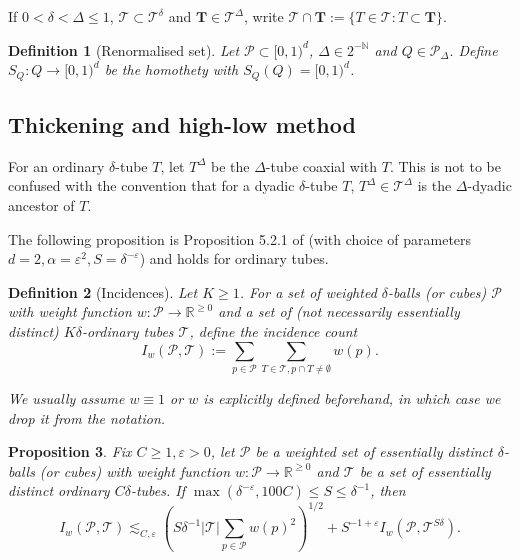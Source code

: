 \documentclass{amsart}
\newtheorem{prop}{Proposition}[section]
\newtheorem{definition}[prop]{Definition}
\newcommand{\R}{\mathbb{R}}
\newcommand{\T}{\mathcal{T}}
\newcommand{\eps}{\varepsilon}
\newcommand{\lesim}{\lesssim}
\newcommand{\bT}{\mathbf{T}}
\newcommand{\cT}{\mathcal{T}}
\newcommand{\cP}{\mathcal{P}}
\begin{document}
If $0<\delta <\Delta \leq 1$,  $\cT\subset \cT^{\delta}$ and $\bT\in \cT^{\Delta}$, write $\cT\cap \bT:=\{ T\in \cT: T\subset \bT\}$. 


\begin{definition}[Renormalised set]
    Let $\cP\subset [0,1)^d$, $\Delta\in 2^{-\mathbb{N}}$ and $Q\in \cP_{\Delta}.$ Define $S_Q: Q\rightarrow [0,1)^d$ be the homothety  with $S_Q(Q)=[0,1)^d$. 
\end{definition}
 

\subsection{Thickening and high-low method}
For an ordinary $\delta$-tube $T$, let $T^\Delta$ be the $\Delta$-tube coaxial with $T$. This is not to be confused with the convention that for a dyadic $\delta$-tube $T$, $T^\Delta \in \cT^\Delta$ is the $\Delta$-dyadic ancestor of $T$. %

The following proposition is Proposition 5.2.1 of \cite{bradshaw2022additive} (with choice of parameters $d = 2, \alpha = \eps^2, S = \delta^{-\eps}$) and holds for ordinary tubes.

\begin{definition}[Incidences]
    Let $K \ge 1$. For a set of weighted $\delta$-balls (or cubes) $\cP$ with weight function $w : \cP \to \R^{\ge 0}$ and a set of (not necessarily essentially distinct) $K\delta$-ordinary tubes $\T$, define the incidence count \[I_w (\cP, \T) := \sum_{p \in \cP} \sum_{T \in \T, p \cap T \neq \emptyset} w(p).\]

    We usually assume $w \equiv 1$ or $w$ is explicitly defined beforehand, in which case we drop it from the notation.
\end{definition}

\begin{prop}\label{prop:high low}
    Fix $C \ge 1, \eps > 0$, let $\cP$ be a weighted set of essentially distinct $\delta$-balls (or cubes) with weight function $w : \cP \to \R^{\ge 0}$ and $\cT$ be a set of essentially distinct ordinary $C\delta$-tubes. If $\max(\delta^{-\eps}, 100C) \le S \le \delta^{-1}$, then
    \begin{equation*}
        I_w(\cP, \cT) \lesim_{C,\eps} \left( S \delta^{-1} |\T| \sum_{p \in \cP} w(p)^2 \right)^{1/2} +
  S^{-1+\eps} I_w(\cP, \T^{S\delta}).
    \end{equation*}
\end{prop}
\end{document}
